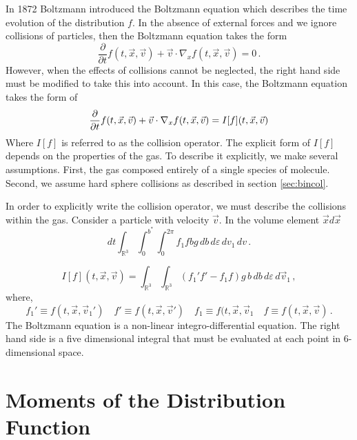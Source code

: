 \documentclass[12pt]{CSUNthesis}
\def\R{\mathbb{R}}
\newcommand{\Rexp}[1]{{\mathbb{R}^{#1}}}
\newcommand{\dydx}[2]{\frac{\partial{#1}}{\partial{#2}}}
\newcommand{\vecx}{\vec{x}}
\newcommand{\vecv}{\vec{v}}
\begin{document}
In 1872 Boltzmann \cite{Boltzmann1872} introduced the Boltzmann equation which describes the time evolution of the distribution $f$. In the absence of external forces and we ignore collisions of particles, then the Boltzmann equation takes the form
\begin{equation}
\label{eq:colless_boltzmann}
\dydx{}{t}f(t, \vecx, \vecv) + \vecv \cdot \nabla_x f(t, \vecx, \vecv) = 0\, .
\end{equation}
However, when the effects of collisions cannot be neglected, the right hand side must be modified to take this into account. In this case, the Boltzmann equation takes the form of
\begin{equation}
\label{eq:boltzmann}
\dydx{}{t}f(t, \vecx, \vecv) + \vecv \cdot \nabla_x f(t, \vecx, \vecv) = I[f](t,\vecx,\vecv)\, \\ 
\end{equation}
Where $I[f]$ is referred to as the collision operator. The explicit form of $I[f]$ depends on the properties of the gas. To describe it explicitly, we make several assumptions. First, the gas composed entirely of a single species of molecule. Second, we assume hard sphere collisions as described in section \ref{sec:bincol}. 

In order to explicitly write the collision operator, we must describe the collisions within the gas. Consider a particle with velocity $\vecv$. In the volume element $\vecx d\vecx$
\begin{equation}
dt \int_{\R^3} \int_0^{b^*} \int_0^{2\pi} f_1 f b g\,  db \, d\varepsilon\, dv_1 \, dv \, .
\end{equation}

\begin{equation}
I[f](t, \vecx, \vecv) = \int_\Rexp{3} \int_\Rexp{3} (f_1' f' - f_1 f) g\, b\, db\, d\varepsilon\, d\vecv_1\, ,
\end{equation}
where,
\begin{equation*}
f_1' \equiv f(t, \vecx, \vecv_1')\quad f' \equiv f(t, \vecx, \vecv') \quad f_1 \equiv f(t, \vecx, \vecv_1 \quad f \equiv f(t, \vecx, \vecv)\, .
\end{equation*}
The Boltzmann equation is a non-linear integro-differential equation. The right hand side is a five dimensional integral that must be evaluated at each point in 6-dimensional space.

\section{Moments of the Distribution Function}
\end{document}
